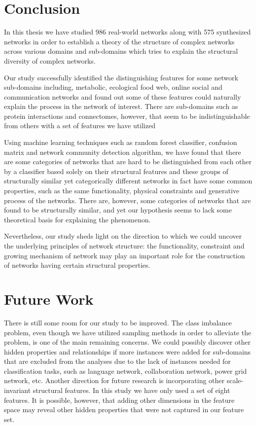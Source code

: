 \documentclass[..]{revtex4}
\begin{document}
 

 \section{Conclusion}
 In this thesis we have studied 986 real-world networks along with 575 synthesized networks in order to establish a  theory of the structure of complex networks across various domains and sub-domains which tries to explain the structural diversity of complex networks.
 
  Our study successfully identified the distinguishing features for some network sub-domains including, metabolic, ecological food web, online social and communication networks and found out some of these features could naturally explain the process in the network of interest. There are sub-domains such as protein interactions and connectomes, however, that seem to be indistinguishable from others with a set of features we have utilized 
  
  Using machine learning techniques such as random forest classifier, confusion matrix and network community detection algorithm, we have found that there are some categories of networks that are hard to be distinguished from each other by a classifier based solely on their structural features and these groups of structurally similar yet categorically different networks in fact have some common properties, such as the same functionality, physical constraints and generative process of the networks. There are, however, some categories of networks that are found to be structurally similar, and yet our hypothesis seems to lack some theoretical basis for explaining the phenomenon.
 
 Nevertheless, our study sheds light on the direction to which we could uncover the underlying principles of network structure: the functionality, constraint and growing mechanism of network may play an important role for the construction of networks having certain structural properties.
 
 

\section{Future Work}
There is still some room for our study to be improved. The class imbalance problem, even though we have utilized sampling methods in order to alleviate the problem, is one of the main remaining concerns. We could possibly discover other hidden properties and relationships if more instances were added for sub-domains that are excluded from the analyses due to the lack of instances needed for classification tasks, such as language network, collaboration network, power grid network, etc. Another direction for future research is incorporating other scale-invariant structural features. In this study we have only used a set of eight features. It is possible, however, that adding other dimensions in the feature space may reveal other hidden properties that were not captured in our feature set. 
\end{document}
